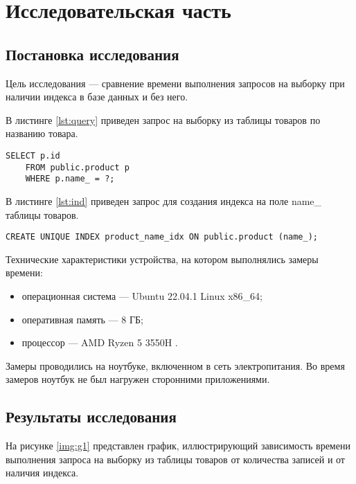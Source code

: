 \chapter{Исследовательская часть}

\section{Постановка исследования}
Цель исследования --- сравнение времени выполнения запросов на выборку при наличии индекса в базе данных и без него.

В листинге \ref{lst:query} приведен запрос на выборку из таблицы товаров по названию товара.
\begin{lstlisting}[label=lst:query,caption=запрос на выборку из таблицы товаров]
	SELECT p.id
	FROM public.product p
	WHERE p.name_ = ?;
\end{lstlisting}

В листинге \ref{lst:ind} приведен запрос для создания индекса на поле name\_ таблицы товаров.
\begin{lstlisting}[label=lst:ind,caption=запрос для создания индекса]
CREATE UNIQUE INDEX product_name_idx ON public.product (name_);
\end{lstlisting}
Технические характеристики устройства, на котором выполнялись замеры времени:

\begin{itemize}
	\item операционная система --- Ubuntu 22.04.1 Linux x86\_64;
	\item оперативная память --- 8 ГБ;
	\item процессор --- AMD Ryzen 5 3550H \cite{amd}.
\end{itemize}

Замеры проводились на ноутбуке, включенном в сеть электропитания. Во время замеров ноутбук не был нагружен сторонними приложениями.

\section{Результаты исследования}

На рисунке \ref{img:g1} представлен график, иллюстрирующий зависимость времени выполнения запроса на выборку из таблицы товаров от количества записей и от наличия индекса.

